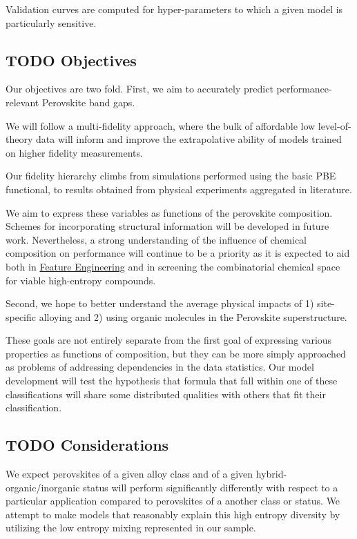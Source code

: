 \documentclass[aip, jmp, amsmath, amssymb]{revtex4-2}
\begin{document}
Validation curves are computed for hyper-parameters to which a given
model is particularly sensitive.

\subsection*{{\bfseries\sffamily TODO} Objectives}
\label{sec:orgf69dcf6}
Our objectives are two fold. First, we aim to accurately predict
performance-relevant Perovskite band gaps.

We will follow a multi-fidelity approach, where the bulk of affordable
low level-of-theory data will inform and improve the extrapolative
ability of models trained on higher fidelity measurements.

Our fidelity hierarchy climbs from simulations performed using the
basic PBE functional, to results obtained from physical experiments
aggregated in literature\cite{almora-2020-devic-perfor}.

We aim to express these variables as functions of the perovskite
composition. Schemes for incorporating structural information will be
developed in future work. Nevertheless, a strong understanding of the
influence of chemical composition on performance will continue to be a
priority as it is expected to aid both in \hyperref[sec:org80c22ac]{Feature Engineering} and in
screening the combinatorial chemical space for viable high-entropy
compounds.

Second, we hope to better understand the average physical impacts
of 1) site-specific alloying and 2) using organic molecules in the
Perovskite superstructure.

These goals are not entirely separate from the first goal of
expressing various properties as functions of composition, but they
can be more simply approached as problems of addressing dependencies
in the data statistics. Our model development will test the hypothesis
that formula that fall within one of these classifications will share
some distributed qualities with others that fit their classification.

\subsection*{{\bfseries\sffamily TODO} Considerations}
\label{sec:orgf19e9f0}
We expect perovskites of a given alloy class and of a given
hybrid-organic/inorganic status will perform significantly differently
with respect to a particular application compared to perovskites of a
another class or status. We attempt to make models that reasonably
explain this high entropy diversity by utilizing the low entropy
mixing represented in our sample.
\end{document}
